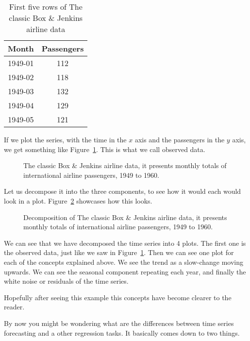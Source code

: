 \documentclass[journal]{IEEEtran}
\begin{document}
\begin{table}[htbp]
  \centering
  \caption{First five rows of The classic Box \& Jenkins airline data}
  \label{tab:passengerdata}
  \begin{tabular}{|c|c|}
    \hline
    Month    & Passengers \\
    \hline
    1949-01  & 112        \\
    1949-02  & 118        \\
    1949-03  & 132        \\
    1949-04  & 129        \\
    1949-05  & 121        \\
    \hline
  \end{tabular}
\end{table}

If we plot the series, with the time in the $x$ axis and the passengers in
the $y$ axis, we get something like Figure~\ref{fig:airpassenger}. This is
what we call observed data.

\begin{figure}[htbp]
  \centering
  
  \caption{The classic Box \& Jenkins airline data, it presents monthly
    totals of international airline passengers, 1949 to 1960.}
  \label{fig:airpassenger}
\end{figure}

Let us decompose it into the three components, to see how it would each would
look in a plot. Figure~\ref{fig:decompose} showcases how this looks.

\begin{figure}[htbp]
  \centering
  
  \caption{Decomposition of The classic Box \& Jenkins airline data, it
    presents monthly totals of international airline passengers, 1949 to
    1960.}
  \label{fig:decompose}
\end{figure}

We can see that we have decomposed the time series into 4 plots. The first one
is the observed data, just like we saw in Figure~\ref{fig:airpassenger}. Then
we can see one plot for each of the concepts explained above. We see the trend
as a slow-change moving upwards. We can see the seasonal component repeating
each year, and finally the white noise or residuals of the time series.

Hopefully after seeing this example this concepts have become clearer to the
reader.

By now you might be wondering what are the differences between time series
forecasting and a other regression tasks. It basically comes down to two
things.
\end{document}

